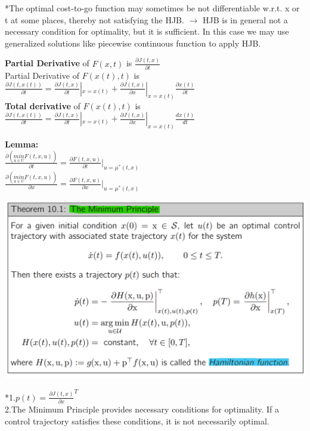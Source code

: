 \documentclass[10pt,landscape]{article}
\newenvironment{Figure}
{\par\medskip\noindent\minipage{\linewidth}}
{\endminipage\par\medskip}
\begin{document}
\begin{multicols*}{4}
*The optimal cost-to-go function may sometimes be not differentiable w.r.t. x or t at some places, thereby not satisfying the HJB. $\rightarrow$ HJB is in general not a necessary condition for optimality, but it is sufficient.
In this case we may use generalized solutions like piecewise continuous function to apply HJB.

\textbf{Partial Derivative} of $F(x,t)$ is $\frac{\partial J(t,x)}{\partial t}$\\
Partial Derivative of $F(x(t),t)$ is
$\frac{\partial J(t,x(t))}{\partial t} = \frac{\partial J(t,x)}{\partial t}|_{x=x(t)} + \frac{\partial J(t,x)}{\partial x}|_{x=x(t)} \frac{\partial x(t)}{\partial t}$\\
\textbf{Total derivative} of $F(x(t),t)$ is
$\frac{\partial J(t,x(t))}{\partial t} = \frac{\partial J(t,x)}{\partial t}|_{x=x(t)} + \frac{\partial J(t,x)}{\partial x}|_{x=x(t)} \frac{dx(t)}{dt}$

\textbf{Lemma:}\\
$\frac{\partial (\underset{u\in U}{min} F(t,x,u))}{\partial t} = \frac{\partial F(t,x,u)}{\partial t}|_{u=\mu^{*}(t,x)}$\\
$\frac{\partial (\underset{u\in U}{min} F(t,x,u))}{\partial x} = \frac{\partial F(t,x,u)}{\partial x}|_{u=\mu^{*}(t,x)}$\\

\begin{Figure}
	\centering
	\includegraphics[width=\linewidth]{pictures/MP.png}
\end{Figure}
*1.$p(t) = \frac{\partial J(t,x)}{\partial x}^T $\\

2.The Minimum Principle provides necessary conditions for optimality. If a
control trajectory satisfies these conditions, it is not necessarily optimal.
\\


\end{multicols*}
\end{document}
